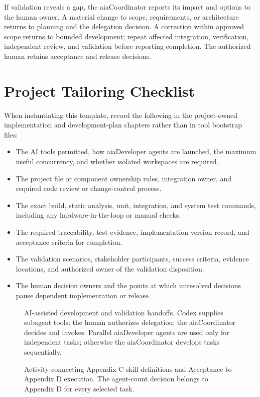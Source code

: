 If validation reveals a gap, the aiaCoordinator reports its impact and options to
the human owner. A material change to scope, requirements, or architecture
returns to planning and the delegation decision. A correction within approved
scope returns to bounded development; repeat affected integration,
verification, independent review, and validation before reporting completion.
The authorized human retains acceptance and release decisions.

\section{Project Tailoring Checklist}
\label{Section:AIImplementationTailoring}
When instantiating this template, record the following in the project-owned
implementation and development-plan chapters rather than in tool bootstrap
files:
\begin{itemize}
\item The AI tools permitted, how aiaDeveloper agents are launched, the maximum
useful concurrency, and whether isolated workspaces are required.
\item The project file or component ownership rules, integration owner, and
required code review or change-control process.
\item The exact build, static analysis, unit, integration, and system test
commands, including any hardware-in-the-loop or manual checks.
\item The required traceability, test evidence, implementation-version record,
and acceptance criteria for completion.
\item The validation scenarios, stakeholder participants, success criteria,
evidence locations, and authorized owner of the validation disposition.
\item The human decision owners and the points at which unresolved decisions
pause dependent implementation or release.
\end{itemize}

\begin{figure}[htbp]
  \centering
  \resizebox{0.98\linewidth}{!}{}
  \caption[AI-assisted development and validation handoffs.]{AI-assisted development and validation handoffs. Codex supplies subagent tools; the human authorizes delegation; the aiaCoordinator decides and invokes. Parallel aiaDeveloper agents are used only for independent tasks; otherwise the aiaCoordinator develops tasks sequentially.}
  \label{Figure:AIImplementationSequence}
\end{figure}

\begin{figure}[htbp]
  \centering
  \resizebox{\linewidth}{!}{}
  \caption{Activity connecting Appendix C skill definitions and Acceptance to Appendix D execution. The agent-count decision belongs to Appendix D for every selected task.}
  \label{Figure:AITaskExecutionActivity}
\end{figure}
